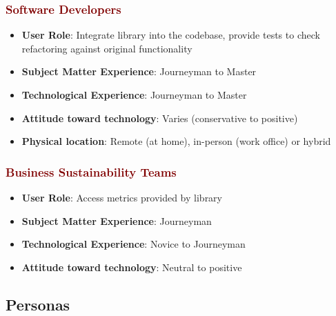 \documentclass[12pt]{article}
\begin{document}
\subsubsection*{\textcolor{Maroon}{Software Developers}}
\begin{itemize}
  \item \textbf{User Role}: Integrate library into the codebase, provide tests to check refactoring against original functionality

  \item \textbf{Subject Matter Experience}: Journeyman to Master
  
  \item \textbf{Technological Experience}: Journeyman to Master
  
  \item \textbf{Attitude toward technology}: Varies (conservative to positive)
  
  \item \textbf{Physical location}: Remote (at home), in-person (work office) or hybrid
\end{itemize}

\subsubsection*{\textcolor{Maroon}{Business Sustainability Teams}}
\begin{itemize}
  \item \textbf{User Role}: Access metrics provided by library

  \item \textbf{Subject Matter Experience}: Journeyman

  \item \textbf{Technological Experience}: Novice to Journeyman
  
  \item \textbf{Attitude toward technology}: Neutral to positive

\end{itemize}

\subsection{Personas}
\end{document}

